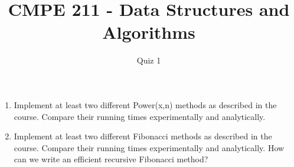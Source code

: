 \documentclass{article}
\begin{document}
\author{Quiz 1}
\title{CMPE 211 - Data Structures and Algorithms}




\date{}
\maketitle
\setcounter{secnumdepth}{0}
\begin{enumerate}
\item Implement at least two different Power(x,n)  methods as described in the course. Compare their running times experimentally and analytically.
\item Implement at least two different Fibonacci methods as described in the course. Compare their running times experimentally and analytically. How can we write an efficient recursive Fibonacci method?

\end{enumerate}
\end{document}
